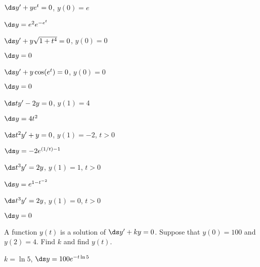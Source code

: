 \begin{enumialphparenastyle}
\begin{multicols}{2}
\begin{ex}
 $\ds y' +ye^t=0$, $y(0)=e$
\begin{sol}
 $\ds y=e^2e^{-e^t}$
\end{sol}
\end{ex}


\begin{ex}
 $\ds y' +y\sqrt{1+t^4}=0$, $y(0)=0$
\begin{sol}
 $\ds y=0$
\end{sol}
\end{ex}


\begin{ex}
 $\ds y' + y\cos(e^t)=0$, $y(0)=0$
\begin{sol}
 $\ds y=0$
\end{sol}
\end{ex}


\begin{ex}
 $\ds ty' - 2y = 0$, $y(1)=4$
\begin{sol}
 $\ds y=4t^2$
\end{sol}
\end{ex}


\begin{ex}
 $\ds t^2y' + y = 0$, $y(1)=-2$, $t>0$
\begin{sol}
 $\ds y=-2e^{(1/t)-1}$
\end{sol}
\end{ex}


\begin{ex}
 $\ds t^3y' = 2y$, $y(1)=1$, $t>0$
\begin{sol}
 $\ds y=e^{1-t^{-2}}$
\end{sol}
\end{ex}


\begin{ex}
 $\ds t^3y' = 2y$, $y(1)=0$, $t>0$
\begin{sol}
 $\ds y=0$
\end{sol}
\end{ex}

\end{multicols}


\begin{ex}
 A function $y(t)$ is a solution of $\ds y' +
ky=0$. Suppose that $y(0)=100$ and $y(2)=4$. Find $k$ and find $y(t)$.
\begin{sol}
 $k=\ln 5$, $\ds y=100e^{-t\ln 5}$
\end{sol}
\end{ex}



\end{enumialphparenastyle}
